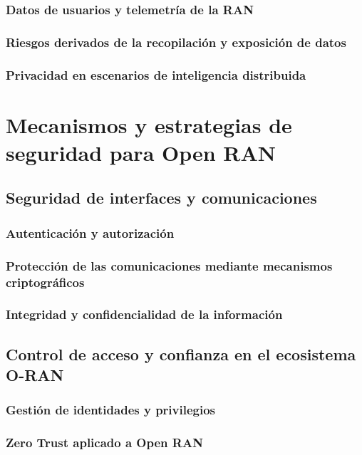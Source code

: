 \documentclass[11pt,a4paper]{article}
\makeatletter
\let\ORIGsection\section
\def\section{\@nobreakfalse\ORIGsection}
\let\ORIGsubsection\subsection
\def\subsection{\@nobreakfalse\ORIGsubsection}
\let\ORIGsubsubsection\subsubsection
\def\subsubsection{\@nobreakfalse\ORIGsubsubsection}
\makeatother
\begin{document}
\subsubsection{Datos de usuarios y telemetría de la RAN}
\subsubsection{Riesgos derivados de la recopilación y exposición de datos}
\subsubsection{Privacidad en escenarios de inteligencia distribuida}


\section{Mecanismos y estrategias de seguridad para Open RAN}

\subsection{Seguridad de interfaces y comunicaciones}

\subsubsection{Autenticación y autorización}
\subsubsection{Protección de las comunicaciones mediante mecanismos criptográficos}
\subsubsection{Integridad y confidencialidad de la información}

\subsection{Control de acceso y confianza en el ecosistema O-RAN}

\subsubsection{Gestión de identidades y privilegios}
\subsubsection{Zero Trust aplicado a Open RAN}
\end{document}
